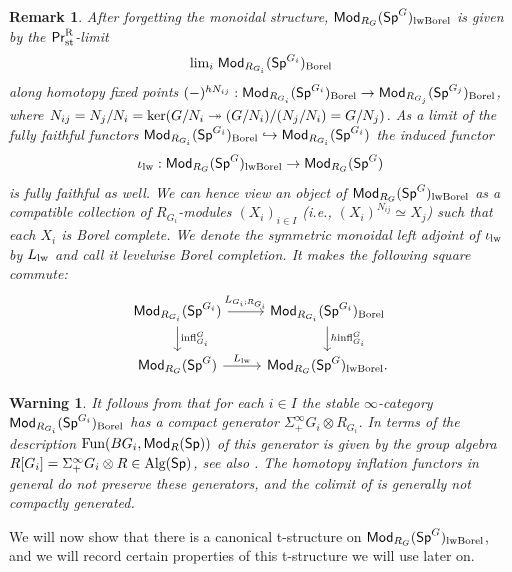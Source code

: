 \documentclass[reqno]{amsart}
\numberwithin{equation}{section}\theoremstyle{thms}
\theoremstyle{defn}
\newtheorem{rem}[equation]{Remark}
\newtheorem{warn}[equation]{Warning}
\newcommand{\tn}[1]{\textnormal{#1}}
\newcommand{\tsf}[1]{\textsf{\textup{#1}}}
\newcommand{\fun}{\tn{Fun}}
\newcommand{\alg}{\tn{Alg}}
\newcommand{\Mod}{\tsf{Mod}}
\newcommand{\spec}{\tsf{Sp}}
\newcommand{\specg}{\tsf{Sp}^G}
\newcommand{\prrst}{\tsf{Pr}^{\tn{R}}_{\tn{st}}}
\begin{document}
\begin{rem}
After forgetting the monoidal structure, $\Mod_{R_G}(\specg)_{\tn{lwBorel}}$ is given by the $\prrst$-limit 
$$\tn{lim}_i \; \Mod_{R_{G_i}}(\spec^{G_i})_{\tn{Borel}}$$ 
along homotopy fixed points $(-)^{hN_{ij}}:\Mod_{R_{G_i}}(\spec^{G_i})_{\tn{Borel}} \to \Mod_{R_{G_j}}(\spec^{G_j})_{\tn{Borel}}$, where $N_{ij} = N_j/N_i = \tn{ker}(G/N_i \twoheadrightarrow (G/N_i)/(N_j/N_i) = G/N_j)$. As a limit of the fully faithful functors $\Mod_{R_{G_i}}(\spec^{G_i})_{\tn{Borel}} \hookrightarrow \Mod_{R_{G_i}}(\spec^{G_i})$ the induced functor
$$\iota_{\tn{lw}}: \Mod_{R_G}(\specg)_{\tn{lwBorel}} \to \Mod_{R_G}(\specg)$$
is fully faithful as well. We can hence view an object of $\Mod_{R_G}(\specg)_{\tn{lwBorel}}$ as a compatible collection of $R_{G_i}$-modules $(X_i)_{i \in I}$ (i.e., $(X_i)^{N_{ij}} \simeq X_j$) such that each $X_i$ is Borel complete. We denote the symmetric monoidal left adjoint of $\iota_{\tn{lw}}$ by $L_{\tn{lw}}$ and call it \emph{levelwise Borel completion}. It makes the following square commute:
\begin{equation}\label{diag:levelwisecompletion}
\begin{tikzcd}
	{\Mod_{R_{G_i}}(\spec^{G_i})} & {\Mod_{R_{G_i}}(\spec^{G_i})_{\tn{Borel}}} \\
	{\Mod_{R_{G}}(\spec^{G})} & {\Mod_{R_G}(\specg)_{\tn{lwBorel}}.}
	\arrow["{L_{G_i;R_{G_i}}}", from=1-1, to=1-2]
	\arrow["{\tn{infl}^G_{G_i}}", from=1-1, to=2-1]
	\arrow["{h\tn{infl}^G_{G_i}}", from=1-2, to=2-2]
	\arrow["{L_{\tn{lw}}}", from=2-1, to=2-2]
\end{tikzcd}
\end{equation}
\end{rem}

\begin{warn}
It follows from \cite[Proposition 2.27]{mnn17} that for each $i\in I$ the stable $\infty$-category $\Mod_{R_{G_i}}(\spec^{G_i})_{\tn{Borel}}$ has a compact generator $\Sigma^{\infty}_+G_i \otimes R_{G_i}$. In terms of the description $\fun(BG_i,\Mod_R(\spec))$ of  this generator is given by the group algebra $R[G_i] = \Sigma^{\infty}_+ G_i \otimes R \in \alg(\spec)$, see also \cite[Remark 6.18]{mnn17}. The homotopy inflation functors in general do not preserve these generators, and the colimit of  is generally not compactly generated.
\end{warn}

We will now show that there is a canonical t-structure on $\Mod_{R_G}(\specg)_{\tn{lwBorel}}$, and we will record certain properties of this t-structure we will use later on.
\end{document}
